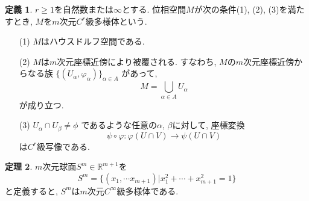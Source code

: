 \documentclass[a4j,12pt]{jarticle}
\theoremstyle{definition}
\newtheorem{theorem}{定理}[section]
\newtheorem{definition}[theorem]{定義}
\begin{document}
\begin{definition}\label{def:C^r manifold}
    $r\geq 1$を自然数または$\infty$とする. 
    位相空間$M$が次の条件(1), (2), (3)を満たすとき, 
    $M$を$m$次元$C^r$級多様体という.
    \begin{itemize}
        \item[(1)]$M$はハウスドルフ空間である.
        \item[(2)]$M$は$m$次元座標近傍により被覆される. 
        すなわち, $M$の$m$次元座標近傍からなる族
        $\{(U_\alpha, \varphi_\alpha)\}_{\alpha \in A}$
        があって, 
        $$M = \bigcup_{\alpha \in A}U_\alpha$$
        が成り立つ. 
        \item[(3)]$U_\alpha \cap U_\beta \neq \phi$
        であるような任意の$\alpha$, $\beta$に対して, 座標変換
        $$\psi \circ \varphi:\varphi(U\cap V)\rightarrow \psi(U\cap V)$$
        は$C^r$級写像である. 
    \end{itemize}
\end{definition}
\begin{theorem}
    $m$次元球面$S^m \in \mathbb{R}^{m+1}$を
    $$S^m=\{(x_1,\cdots x_{m+1})|x_1^2+\cdots +x_{m+1}^2=1\}$$
    と定義すると, $S^m$は$m$次元$C^{\infty}$級多様体である. 
\end{theorem}
\end{document}
